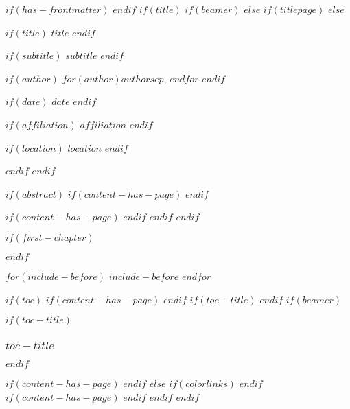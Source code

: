\documentclass[
$if(fontsize)$
  $fontsize$,
$endif$
$if(lang)$
  $babel-lang$,
$endif$
$if(papersize)$
  $papersize$paper,
$endif$
$if(beamer)$
  ignorenonframetext,
$if(handout)$
  handout,
$endif$
$if(aspectratio)$
  aspectratio=$aspectratio$,
$endif$
$endif$
$for(classoption)$
  $classoption$$sep$,
$endfor$
]{$documentclass$}
\begin{document}
$if(has-frontmatter)$
\frontmatter
$endif$
$if(title)$
$if(beamer)$
\frame{\titlepage}
$else$
$if(titlepage)$
$else$


\thispagestyle{plain}
{\color{titlepageTextColor}
\begin{center}
\vspace{0.5cm}
$if(title)$
\huge{\uppercase{$title$}}
\vspace{0.2cm}
$endif$

$if(subtitle)$
\Large{$subtitle$}
\vspace{0.4cm}
$endif$

$if(author)$
\normalsize{\textsf{$for(author)$$author$$sep$, $endfor$}}
\vspace{0.2cm}
$endif$

$if(date)$
\normalsize{\uppercase{$date$}}
\vspace{0.4cm}
$endif$

$if(affiliation)$
\normalsize{ $affiliation$}
\vspace{0.1cm}
$endif$

$if(location)$
\normalsize{$location$}
$endif$
\vspace{0.5cm}
\end{center}
}

$endif$
$endif$


$if(abstract)$
$if(content-has-page)$
\thispagestyle{empty}
$endif$
\begin{abstract}
$abstract$
\end{abstract}
$if(content-has-page)$
\newpage
$endif$
$endif$
$endif$

$if(first-chapter)$
\setcounter{chapter}{$first-chapter$}
\addtocounter{chapter}{-1}
$endif$


$for(include-before)$
$include-before$
$endfor$

$if(toc)$
$if(content-has-page)$
\thispagestyle{empty}
$endif$
$if(toc-title)$
\renewcommand*\contentsname{$toc-title$}
$endif$
$if(beamer)$
\begin{frame}[allowframebreaks]
$if(toc-title)$
  \frametitle{$toc-title$}
$endif$
  \tableofcontents[hideallsubsections]
\end{frame}
$if(content-has-page)$
\newpage
$endif$
$else$
{
$if(colorlinks)$
\hypersetup{linkcolor=$if(toccolor)$$toccolor$$else$$endif$}
$endif$
\setcounter{tocdepth}{$toc-depth$}
\tableofcontents
$if(content-has-page)$
\newpage
$endif$
}
$endif$
$endif$
\end{document}
